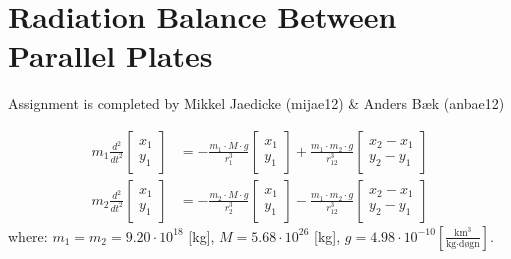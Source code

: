 \section*{Radiation Balance Between Parallel Plates}
Assignment is completed by Mikkel Jaedicke (mijae12) \& Anders Bæk (anbae12)


\begin{equation}
\begin{align*}
m_{ 1 }\frac { { d }^{ 2 } }{ { dt }^{ 2 } } \left[ \begin{matrix} x_{ 1 } \\ y_{ 1 } \end{matrix} \right] &=-\frac { m_{ 1 }\cdot M\cdot g }{ { r }^{ 3 }_{ 1 } } \left[ \begin{matrix} x_{ 1 } \\ y_{ 1 } \end{matrix} \right] +\frac { m_{ 1 }\cdot m_2\cdot g }{ { r }^{ 3 }_{ 12 } } \left[ \begin{matrix} x_{ 2 }-x_{ 1 } \\ y_{ 2 }-y_{ 1 } \end{matrix} \right] \\
m_{ 2 }\frac { { d }^{ 2 } }{ { dt }^{ 2 } } \left[ \begin{matrix} x_{ 1 } \\ y_{ 1 } \end{matrix} \right] &=-\frac { m_{ 2 }\cdot M\cdot g }{ { r }^{ 3 }_{ 2 } } \left[ \begin{matrix} x_{ 1 } \\ y_{ 1 } \end{matrix} \right] -\frac { m_{ 1 }\cdot m_{ 2 }\cdot g }{ { r }^{ 3 }_{ 12 } } \left[ \begin{matrix} x_{ 2 }-x_{ 1 } \\ y_{ 2 }-y_{ 1 } \end{matrix} \right] 
\end{align*}
\label{eq:1}
\end{equation}
where: \( m_1 = m_2 =9.20 \cdot 10^{18} \) [kg], \( M = 5.68  \cdot 10^{26} \) [kg], \( g = 4.98 \cdot 10^{-10} \left[ \frac { \text{km}^3 }{ \text{kg} \cdot \text{døgn} }  \right] \).

